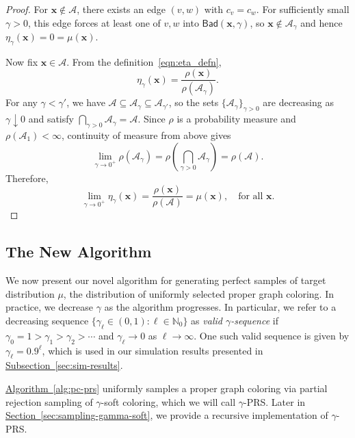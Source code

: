 \documentclass[12pt, a4paper]{article}
\theoremstyle{plain}
\theoremstyle{definition}
\theoremstyle{remark}
\newcommand{\mc}{\mathcal}
\renewcommand{\v}[1]{\boldsymbol{#1}}
\newcommand{\mx}{\v{x}}
\newcommand{\lt}{\left}
\newcommand{\rt}{\right}
\newcommand{\sref}[2]{\hyperref[#2]{#1~\ref*{#2}}}
\newcommand{\bad}{\mathsf{Bad}}
\begin{document}
\begin{proof}
For \(\mx\notin\mc A\), there exists an edge \((v,w)\) with \(c_v=c_w\). For sufficiently small \(\gamma>0\), this edge forces at least one of \(v,w\) into \(\bad(\mx,\gamma)\), so \(\mx\notin\mc A_\gamma\) and hence \(\eta_\gamma(\mx)=0=\mu(\mx)\).

Now fix \(\mx\in\mc A\). From the definition~\eqref{eqn:eta_defn},
\[
\eta_\gamma (\mx) = \frac{\rho(\mx)}{\rho(\mc A_{\gamma})}.
\]
For any \(\gamma < \gamma'\), we have \(\mc A \subseteq \mc A_{\gamma} \subseteq \mc A_{\gamma'}\), so the sets \(\{\mc A_\gamma\}_{\gamma>0}\) are decreasing as \(\gamma\downarrow0\) and satisfy \(\bigcap_{\gamma>0}\mc A_\gamma = \mc A\). Since \(\rho\) is a probability measure and \(\rho(\mc A_1)<\infty\), continuity of measure from above \cite[Chapter 2]{SB95} gives
\[
\lim_{\gamma \to 0^+} \rho(\mc A_\gamma) =  \rho\lt(\bigcap_{\gamma>0} \mc A_\gamma\rt) = \rho(\mc A).
\]
Therefore,
\[
\lim_{\gamma \to 0^+} \eta_\gamma(\mx)  = \frac{\rho(\mx)}{\rho(\mc A)} = \mu(\mx), \quad \text{for all}\,\, \mx.
\]
\end{proof}

\subsection{The New Algorithm}
We now present our novel algorithm for generating perfect samples of target distribution $\mu$, the distribution of uniformly selected proper graph coloring. In practice, we decrease \(\gamma\) as the algorithm progresses. In particular,  we refer to a decreasing sequence $\{\gamma_\ell \in (0, 1) : \ell \in \mathbb{N}_0\}$ as {\em valid $\gamma$-sequence} if $\gamma_0 = 1 > \gamma_1 > \gamma_2 > \cdots $ and $\gamma_\ell \to 0$ as $\ell \to \infty$. One such valid sequence is given by $\gamma_\ell = 0.9^\ell$, which is used in our simulation results presented in \sref{Subsection}{sec:sim-results}.

\sref{Algorithm}{alg:pc-prs} uniformly samples a proper graph coloring via partial rejection sampling of \(\gamma\)-soft coloring, which we will call \(\gamma\)-PRS. Later in \sref{Section}{sec:sampling-gamma-soft}, we provide a recursive implementation of \(\gamma\)-PRS.
\end{document}
